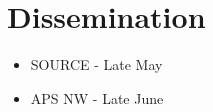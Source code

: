 \documentclass{article}
\begin{document}
    
\section{Dissemination}

    \begin{itemize}
        \item SOURCE - Late May
        \item APS NW - Late June
    \end{itemize}

\pagebreak
\nocite{*}
\printbibliography
\end{document}
